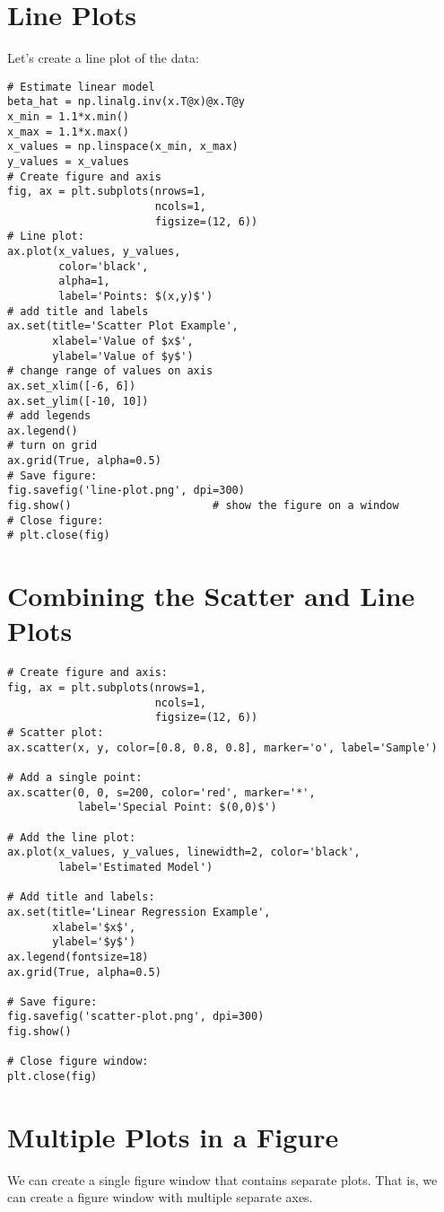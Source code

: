 \documentclass[12pt, a4paper]{article}
\begin{document}
\section{Line Plots}
\label{sec:org79e92a2}
Let's create a line plot of the data:
\lstset{language=jupyter-python,label= ,caption= ,captionpos=b,numbers=none}
\begin{lstlisting}
# Estimate linear model
beta_hat = np.linalg.inv(x.T@x)@x.T@y
x_min = 1.1*x.min()
x_max = 1.1*x.max()
x_values = np.linspace(x_min, x_max)
y_values = x_values
# Create figure and axis
fig, ax = plt.subplots(nrows=1,
                       ncols=1,
                       figsize=(12, 6))
# Line plot:
ax.plot(x_values, y_values,
        color='black',
        alpha=1,
        label='Points: $(x,y)$')
# add title and labels
ax.set(title='Scatter Plot Example',
       xlabel='Value of $x$',
       ylabel='Value of $y$')
# change range of values on axis
ax.set_xlim([-6, 6])
ax.set_ylim([-10, 10])
# add legends
ax.legend()
# turn on grid
ax.grid(True, alpha=0.5)
# Save figure:
fig.savefig('line-plot.png', dpi=300)
fig.show()                      # show the figure on a window
# Close figure:
# plt.close(fig)
\end{lstlisting}
\section{Combining the Scatter and Line Plots}
\label{sec:org6bbcccb}
\lstset{language=jupyter-python,label= ,caption= ,captionpos=b,numbers=none}
\begin{lstlisting}
# Create figure and axis:
fig, ax = plt.subplots(nrows=1,
                       ncols=1,
                       figsize=(12, 6))
# Scatter plot:
ax.scatter(x, y, color=[0.8, 0.8, 0.8], marker='o', label='Sample')

# Add a single point:
ax.scatter(0, 0, s=200, color='red', marker='*',
           label='Special Point: $(0,0)$')

# Add the line plot:
ax.plot(x_values, y_values, linewidth=2, color='black',
        label='Estimated Model')

# Add title and labels:
ax.set(title='Linear Regression Example',
       xlabel='$x$',
       ylabel='$y$')
ax.legend(fontsize=18)
ax.grid(True, alpha=0.5)

# Save figure:
fig.savefig('scatter-plot.png', dpi=300)
fig.show()

# Close figure window:
plt.close(fig)
\end{lstlisting}
\section{Multiple Plots in a Figure}
\label{sec:org8fb8626}
We can create a single figure window that contains separate plots.
That is, we can create a figure window with multiple separate axes.
\end{document}
